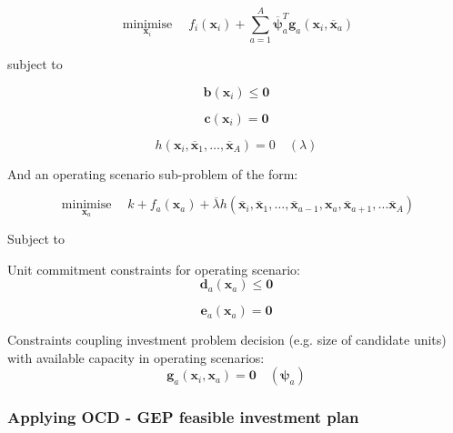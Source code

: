 \documentclass{article}
\DeclareMathOperator*{\minimise}{minimise}
\begin{document}
\begin{equation}
	\minimise\limits_{\bm{x}_{i}} \quad f_{i}(\bm{x}_{i}) + \sum\limits_{a=1}^{A} \overline{\bm{\psi}}_{a}^{T} \bm{g}_{a}\left(\bm{x}_{i}, \overline{\bm{x}}_{a}\right)
\end{equation}

subject to

\begin{equation}
\bm{b} \left(\bm{x}_{i}\right) \leq \bm{0}
\end{equation}

\begin{equation}
\bm{c} \left(\bm{x}_{i}\right) = \bm{0}
\end{equation}

\begin{equation}
h\left(\bm{x}_{i}, \overline{\bm{x}}_{1}, \ldots, \overline{\bm{x}}_{A}\right) = 0 \quad (\lambda)
\end{equation}

And an operating scenario sub-problem of the form:

\begin{equation}
\minimise\limits_{\bm{x}_{a}} \quad k + f_{a}(\bm{x}_{a}) + \overline{\lambda}h\left(\overline{\bm{x}}_{i}, \overline{\bm{x}}_{1}, \ldots, \overline{\bm{x}}_{a-1}, \bm{x}_{a}, \overline{\bm{x}}_{a+1}, \ldots \overline{\bm{x}}_{A}\right)
\end{equation}

Subject to

Unit commitment constraints for operating scenario:
\begin{equation}
\bm{d}_{a}\left(\bm{x}_{a}\right) \leq \bm{0}
\end{equation}

\begin{equation}
\bm{e}_{a}\left(\bm{x}_{a}\right) = \bm{0}
\end{equation}

Constraints coupling investment problem decision (e.g. size of candidate units) with available capacity in operating scenarios:
\begin{equation}
\bm{g}_{a}\left(\bm{x}_{i}, \bm{x}_{a}\right) = \bm{0} \quad (\bm{\psi}_{a})
\end{equation}


\subsubsection{Applying OCD - GEP feasible investment plan}
\end{document}
